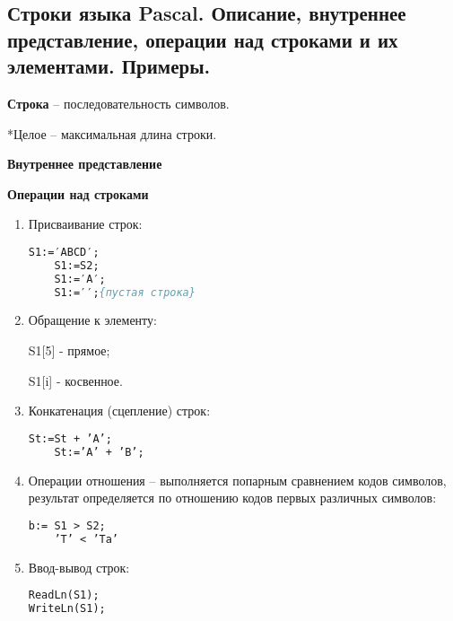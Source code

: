 



\newpage\subsection{Строки языка Pascal. Описание, внутреннее представление, операции над строками и их 
элементами. Примеры. }

\begin{myquote}
            
\end{myquote}

{\bf{Строка}} – последовательность символов.


*Целое – максимальная длина строки.

{\bf{Внутреннее представление}}

{\bf{Операции над строками}}
\begin{enumerate}
\item Присваивание строк:

\begin{lstlisting}[language=Pascal]
 	S1:=′ABCD′;
	S1:=S2;
	S1:=′A′;
	S1:=′′;{пустая строка}
\end{lstlisting}
    
\item Обращение к элементу:

	S1[5] - прямое;

	S1[i] - косвенное.

\item Конкатенация (сцепление) строк:

\begin{lstlisting}[language=Pascal]
	St:=St + ’A’;
	St:=’A’ + ’B’;
\end{lstlisting}

\item Операции отношения – выполняется попарным сравнением кодов символов, результат определяется по отношению кодов первых различных символов:

\begin{lstlisting}[language=Pascal]
	b:= S1 > S2;
	’T’ < ’Ta’
\end{lstlisting}

\item Ввод-вывод строк:

\begin{lstlisting}[language=Pascal]
ReadLn(S1);
WriteLn(S1);
\end{lstlisting}

\end{enumerate}

